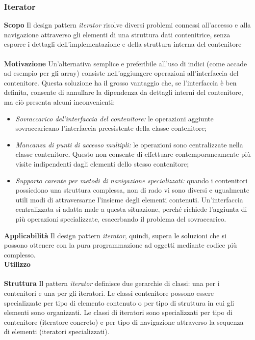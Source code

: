 \subsubsection{Iterator}
\textbf{Scopo}	Il design pattern \textit{iterator} risolve diversi problemi connessi all'accesso e alla navigazione attraverso gli elementi di una struttura dati contenitrice, senza esporre i dettagli dell'implementazione e della struttura interna del contenitore
\\\\
\textbf{Motivazione}	Un'alternativa semplice e preferibile all'uso di indici (come accade ad esempio per gli array) consiste nell'aggiungere operazioni all'interfaccia del contenitore. Questa soluzione ha il grosso vantaggio che, se l'interfaccia è ben definita, consente di annullare la dipendenza da dettagli interni del contenitore, ma ciò presenta alcuni inconvenienti:
	\begin{itemize}
		\item \textit{Sovraccarico del'interfaccia del contenitore:} le operazioni aggiunte sovraccaricano l'interfaccia preesistente della classe contenitore;
		\item \textit{Mancanza di punti di accesso multipli:} le operazioni sono centralizzate nella classe contenitore. Questo non consente di effettuare contemporaneamente più visite indipendenti dagli elementi dello stesso contenitore;
		\item \textit{Supporto carente per metodi di navigazione specializzati:} quando i contenitori possiedono una struttura complessa, non di rado vi sono diversi e ugualmente utili modi di attraversarne l'insieme degli elementi contenuti. Un'interfaccia centralizzata si adatta male a questa situazione, perché richiede l'aggiunta di più operazioni specializzate, esacerbando il problema del sovraccarico.
	\end{itemize}
\textbf{Applicabilità}	Il design pattern \textit{iterator}, quindi, supera le soluzioni che si possono ottenere con la pura programmazione ad oggetti mediante codice più complesso.
\\
\textbf{Utilizzo}
\\\\
\textbf{Struttura}	Il pattern \textit{iterator} definisce due gerarchie di classi: una per i contenitori e una per gli iteratori. Le classi contenitore possono essere specializzate per tipo di elemento contenuto o per tipo di struttura in cui gli elementi sono organizzati. Le classi di iteratori sono specializzati per tipo di contenitore (iteratore concreto) e per tipo di navigazione attraverso la sequenza di elementi (iteratori specializzati).
